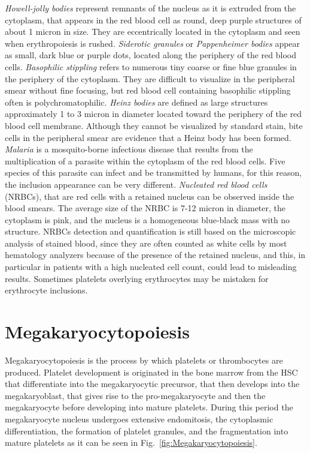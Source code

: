 \textit{Howell-jolly bodies} represent remnants of the nucleus as it is extruded from the cytoplasm, that appears in the red blood cell as round, deep purple structures of about 1 micron in size. They are eccentrically located in the cytoplasm and seen when erythropoiesis is rushed. \textit{Siderotic granules} or \textit{Pappenheimer bodies} appear as small, dark blue or purple dots, located along the periphery of the red blood cells. \textit{Basophilic stippling} refers to numerous tiny coarse or fine blue granules in the periphery of the cytoplasm. They are difficult to visualize in the peripheral smear without fine focusing, but red blood cell containing basophilic stippling often is polychromatophilic. \textit{Heinz bodies} are defined as large structures approximately 1 to 3 micron in diameter located toward the periphery of the red blood cell membrane. Although they cannot be visualized by standard stain, bite cells in the peripheral smear are evidence that a Heinz body has been formed. \textit{Malaria} is a mosquito-borne infectious disease that results from the multiplication of a parasite within the cytoplasm of the red blood cells. Five species of this parasite can infect and be transmitted by humans, for this reason, the inclusion appearance can be very different. \textit{Nucleated red blood cells} (NRBCs), that are red cells with a retained nucleus can be observed inside the blood smears. The average size of the NRBC is 7-12 micron in diameter, the cytoplasm is pink, and the nucleus is a homogeneous blue-black mass with no structure. NRBCs detection and quantification is still based on the microscopic analysis of stained blood, since they are often counted as white cells by most hematology analyzers because of the presence of the retained nucleus, and this, in particular in patients with a high nucleated cell count, could lead to misleading results. Sometimes platelets overlying erythrocytes may be mistaken for erythrocyte inclusions. 

\section{Megakaryocytopoiesis}
Megakaryocytopoiesis is the process by which platelets or thrombocytes are produced. Platelet development is originated in the bone marrow from the HSC that differentiate into the megakaryocytic precursor, that then develops into the megakaryoblast, that gives rise to the pro-megakaryocyte and then the megakaryocyte before developing into mature platelets. During this period the megakaryocyte nucleus undergoes extensive endomitosis, the cytoplasmic differentiation, the formation of platelet granules, and the fragmentation into mature platelets as it can be seen in Fig.~\ref{fig:Megakaryocytopoiesis}.

